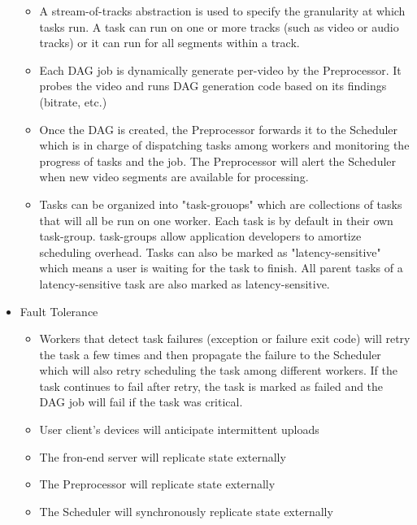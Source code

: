 \documentclass[a4paper]{article}
\begin{document}
\begin{itemize}
\begin{itemize}
\item A stream-of-tracks abstraction is used to specify the granularity at which tasks run. A task can run on one or more tracks (such as video or audio tracks) or it can run for all segments within a track.

\item Each DAG job is dynamically generate per-video by the Preprocessor. It probes the video and runs DAG generation code based on its findings (bitrate, etc.)

\item Once the DAG is created, the Preprocessor forwards it to the Scheduler which is in charge of dispatching tasks among workers and monitoring the progress of tasks and the job. The Preprocessor will alert the Scheduler when new video segments are available for processing.

\item Tasks can be organized into "task-grouops" which are collections of tasks that will all be run on one worker. Each task is by default in their own task-group. task-groups allow application developers to amortize scheduling overhead. Tasks can also be marked as "latency-sensitive" which means a user is waiting for the task to finish. All parent tasks of a latency-sensitive task are also marked as latency-sensitive. 

\end{itemize}

\item Fault Tolerance
\begin{itemize}
\item Workers that detect task failures (exception or failure exit code) will retry the task a few times and then propagate the failure to the Scheduler which will also retry scheduling the task among different workers. If the task continues to fail after retry, the task is marked as failed and the DAG job will fail if the task was critical.

\item User client's devices will anticipate intermittent uploads

\item The fron-end server will replicate state externally

\item The Preprocessor will replicate state externally

\item The Scheduler will synchronously replicate state externally


\end{itemize}
\end{itemize}
\end{document}
